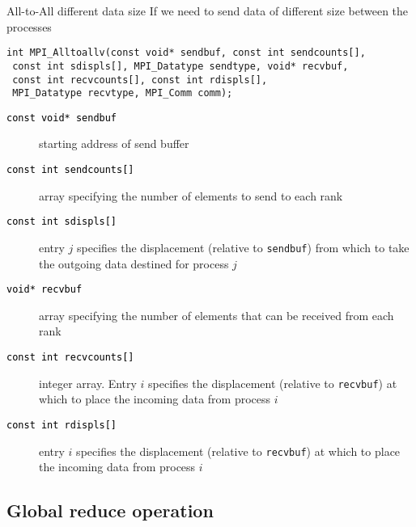 \documentclass[xcolor={svgnames,usenames}]{beamer}
\begin{document}
\begin{frame}[fragile]{All-to-All different data size}
\small\vspace{-1em}
If we need to send data of different size between the processes
\begin{verbatim}
int MPI_Alltoallv(const void* sendbuf, const int sendcounts[],
 const int sdispls[], MPI_Datatype sendtype, void* recvbuf,
 const int recvcounts[], const int rdispls[],
 MPI_Datatype recvtype, MPI_Comm comm);
\end{verbatim}
\vspace{-0.8em}
\begin{description}
\item[\textcolor{black}{\texttt{const void* sendbuf}}] starting address of send buffer
\item[\textcolor{black}{\texttt{const int sendcounts[]}}] array  specifying the number of elements to send to each rank
\item[\textcolor{black}{\texttt{const int sdispls[]}}] entry $j$ specifies
the displacement (relative to \texttt{sendbuf}) from which to
take the outgoing data destined for process $j$
\item[\textcolor{black}{\texttt{void* recvbuf}}] array specifying the number of elements that can be received from each rank
\item[\textcolor{black}{\texttt{const int recvcounts[]}}] integer array. Entry $i$ specifies
the displacement (relative to \texttt{recvbuf}) at which to place the incoming data from process $i$
\item[\textcolor{black}{\texttt{const int rdispls[]}}] entry $i$ specifies
the displacement (relative to \texttt{recvbuf}) at which to place
the incoming data from process $i$
\end{description}
\end{frame}

\subsection{Global reduce operation}
\end{document}
